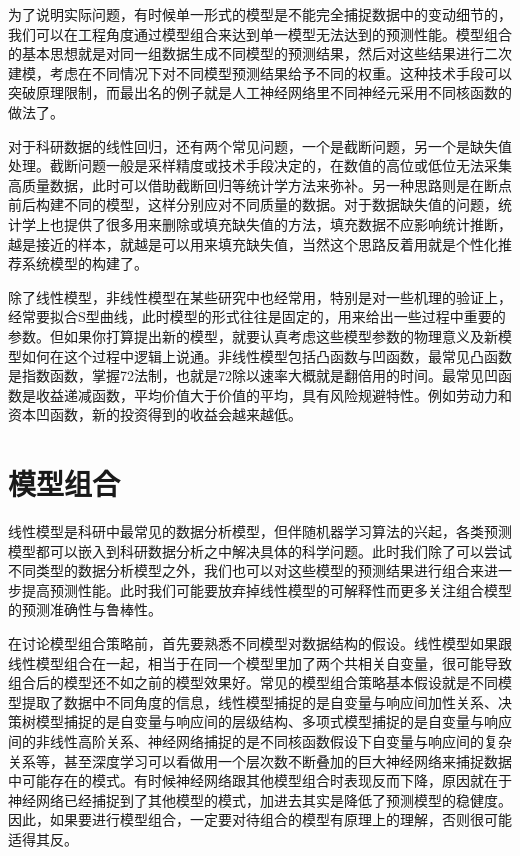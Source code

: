 \documentclass[]{tufte-book}
\begin{document}
为了说明实际问题，有时候单一形式的模型是不能完全捕捉数据中的变动细节的，我们可以在工程角度通过模型组合来达到单一模型无法达到的预测性能。模型组合的基本思想就是对同一组数据生成不同模型的预测结果，然后对这些结果进行二次建模，考虑在不同情况下对不同模型预测结果给予不同的权重。这种技术手段可以突破原理限制，而最出名的例子就是人工神经网络里不同神经元采用不同核函数的做法了。

对于科研数据的线性回归，还有两个常见问题，一个是截断问题，另一个是缺失值处理。截断问题一般是采样精度或技术手段决定的，在数值的高位或低位无法采集高质量数据，此时可以借助截断回归等统计学方法来弥补。另一种思路则是在断点前后构建不同的模型，这样分别应对不同质量的数据。对于数据缺失值的问题，统计学上也提供了很多用来删除或填充缺失值的方法，填充数据不应影响统计推断，越是接近的样本，就越是可以用来填充缺失值，当然这个思路反着用就是个性化推荐系统模型的构建了。

除了线性模型，非线性模型在某些研究中也经常用，特别是对一些机理的验证上，经常要拟合S型曲线，此时模型的形式往往是固定的，用来给出一些过程中重要的参数。但如果你打算提出新的模型，就要认真考虑这些模型参数的物理意义及新模型如何在这个过程中逻辑上说通。非线性模型包括凸函数与凹函数，最常见凸函数是指数函数，掌握72法制，也就是72除以速率大概就是翻倍用的时间。最常见凹函数是收益递减函数，平均价值大于价值的平均，具有风险规避特性。例如劳动力和资本凹函数，新的投资得到的收益会越来越低。

\hypertarget{ux6a21ux578bux7ec4ux5408}{%
\section{模型组合}\label{ux6a21ux578bux7ec4ux5408}}

线性模型是科研中最常见的数据分析模型，但伴随机器学习算法的兴起，各类预测模型都可以嵌入到科研数据分析之中解决具体的科学问题。此时我们除了可以尝试不同类型的数据分析模型之外，我们也可以对这些模型的预测结果进行组合来进一步提高预测性能。此时我们可能要放弃掉线性模型的可解释性而更多关注组合模型的预测准确性与鲁棒性。

在讨论模型组合策略前，首先要熟悉不同模型对数据结构的假设。线性模型如果跟线性模型组合在一起，相当于在同一个模型里加了两个共相关自变量，很可能导致组合后的模型还不如之前的模型效果好。常见的模型组合策略基本假设就是不同模型提取了数据中不同角度的信息，线性模型捕捉的是自变量与响应间加性关系、决策树模型捕捉的是自变量与响应间的层级结构、多项式模型捕捉的是自变量与响应间的非线性高阶关系、神经网络捕捉的是不同核函数假设下自变量与响应间的复杂关系等，甚至深度学习可以看做用一个层次数不断叠加的巨大神经网络来捕捉数据中可能存在的模式。有时候神经网络跟其他模型组合时表现反而下降，原因就在于神经网络已经捕捉到了其他模型的模式，加进去其实是降低了预测模型的稳健度。因此，如果要进行模型组合，一定要对待组合的模型有原理上的理解，否则很可能适得其反。
\end{document}
